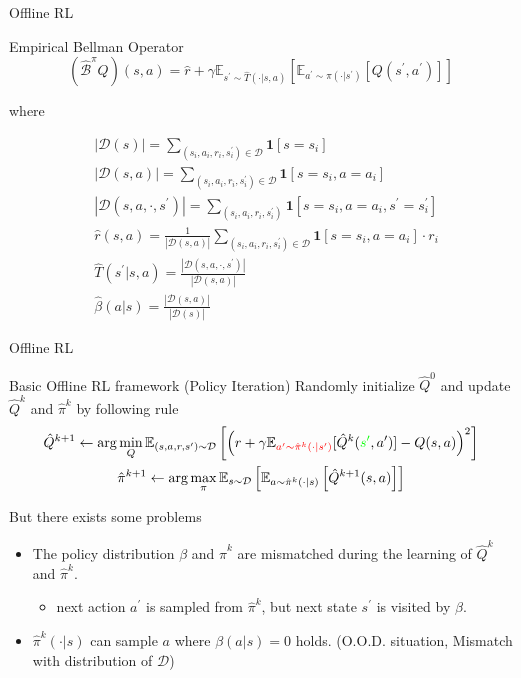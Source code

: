 \documentclass[11pt]{beamer}
\newcommand{\mbb}[1]{\mathbb{#1}}
\newcommand{\mb}[1]{\mathbf{#1}}
\newcommand{\mc}[1]{\mathcal{#1}}
\newcommand{\abs}[1]{\left\lvert #1 \right\rvert}
\begin{document}
\begin{frame}{Offline RL}
  \begin{block}{Empirical Bellman Operator}
    \[
      (\hat{\mc{B}}^\pi Q)(s,a) = \hat{r} + \gamma \mbb{E}_{s^\prime \sim \hat{T}(\cdot | s,a)}\left[\mbb{E}_{a^\prime \sim \pi(\cdot |s^\prime)} \left[ Q(s^\prime,a^\prime) \right]\right]
    \]

    where

    \[
    \begin{aligned}
    &\abs{\mc{D}(s)} = \sum_{(s_i,a_i,r_i,s_i^\prime) \in \mc{D}}\mb{1}[s=s_i] \\
    &\abs{\mc{D}(s,a)} = \sum_{(s_i,a_i,r_i,s^\prime_i)\in\mc{D}}\mb{1}[s=s_i, a=a_i]\\
    &\abs{\mc{D}(s,a,\cdot, s^\prime)} = \sum_{(s_i, a_i, r_i, s^\prime_i)} \mb{1}[s=s_i, a=a_i, s^\prime=s_i^\prime] \\
    &\hat{r}(s,a) = \frac{1}{\abs{\mc{D}(s,a)}} \sum_{(s_i, a_i, r_i, s_i^\prime) \in \mc{D}}\mb{1}[s=s_i,a=a_i]\cdot r_i \\
    &\hat{T}(s^\prime|s,a) = \frac{\abs{\mc{D}(s,a,\cdot, s^\prime)}}{\abs{\mc{D}(s,a)}} \\
    &\hat{\beta}(a|s) = \frac{\abs{\mc{D}(s,a)}}{\abs{\mc{D}(s)}}
    \end{aligned}
    \]
  \end{block}
\end{frame}

\begin{frame}{Offline RL}
  \begin{block}{Basic Offline RL framework (Policy Iteration)}
    Randomly initialize $\hat{Q}^{0}$ and update $\hat{Q}^k$ and $\hat{\pi}^k$ by following rule
    \[
    \begin{gathered}
      \hat{Q}^{k+1} \leftarrow \arg\min_Q \mbb{E}_{(s,a,r,s^\prime) \sim \mc{D}}\left[\left(r + \gamma \mbb{E}_{\textcolor{red}{a^\prime \sim \hat{\pi}^k (\cdot | s^\prime)}}[\hat{Q}^k(\textcolor{green}{s^\prime}, a^\prime)]  - Q(s,a)\right)^2\right] \\
      \hat{\pi}^{k+1} \leftarrow \arg\max_\pi \mbb{E}_{s \sim \mc{D}} \left[\mbb{E}_{a \sim \hat{\pi}^k(\cdot|s)} \left[\hat{Q}^{k+1}(s,a)\right]\right]
    \end{gathered}
    \]
  \end{block}
  But there exists some problems
  \begin{itemize}
    \item The policy distribution $\beta$ and $\hat{\pi}^k$ are mismatched during the learning of $\hat{Q}^k$ and $\hat{\pi}^k$.
    \begin{itemize}
      \item next action $a^\prime$ is sampled from $\hat{\pi}^k$, but next state $s^\prime$ is visited by $\beta$.
    \end{itemize}
    \item $\hat{\pi}^k(\cdot|s)$ can sample $a$ where $\beta(a|s) = 0$ holds. (O.O.D. situation, Mismatch with distribution of $\mc{D}$)
  \end{itemize}
\end{frame}
\end{document}
